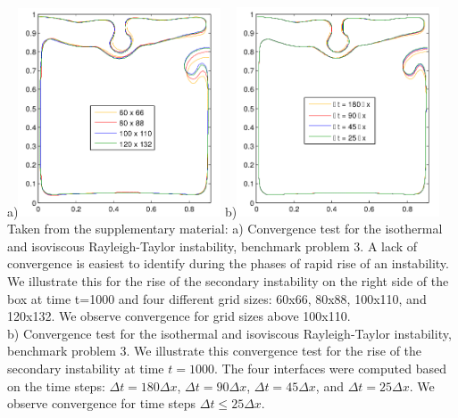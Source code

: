\begin{itemize}
\begin{center}
a)\includegraphics[width=6cm]{images/benchmark_vaks97/sunh10_f}
b)\includegraphics[width=6cm]{images/benchmark_vaks97/sunh10_g}\\
{\captionfont Taken from the supplementary material: a) Convergence test for the isothermal and isoviscous Rayleigh-Taylor instability, benchmark problem 3.
A lack of convergence is easiest to identify during the phases of rapid rise of an instability. We illustrate this for the rise of
the secondary instability on the right side of the box at time t=1000 and four different grid sizes: 60x66, 80x88, 100x110,
and 120x132. We observe convergence for grid sizes above 100x110.\\
b) Convergence test for the isothermal and isoviscous Rayleigh-Taylor instability, benchmark problem 3.
We illustrate this convergence test for the rise of the secondary instability at time $t=1000$. The four
interfaces were computed based on the time steps: $\Delta t = 180 \Delta x$, $\Delta t = 90 \Delta x$, 
$\Delta t = 45 \Delta x$, and $\Delta t = 25 \Delta x$. We observe convergence for time steps $\Delta t \le 25 \Delta x$.
}
\end{center}


\end{itemize}
